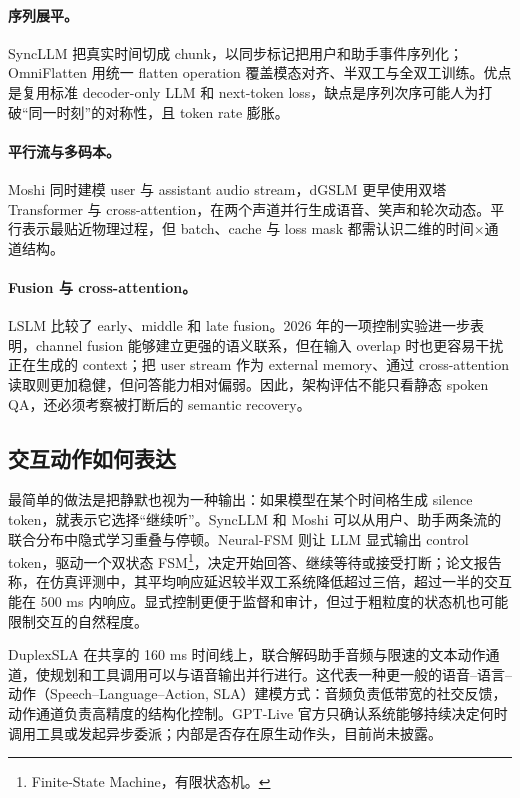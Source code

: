 \paragraph{序列展平。}
SyncLLM 把真实时间切成 chunk，以同步标记把用户和助手事件序列化；OmniFlatten 用统一 flatten operation 覆盖模态对齐、半双工与全双工训练\cite{veluri2024syncllm,zhang2024omniflatten}。优点是复用标准 decoder-only LLM 和 next-token loss，缺点是序列次序可能人为打破“同一时刻”的对称性，且 token rate 膨胀。

\paragraph{平行流与多码本。}
Moshi 同时建模 user 与 assistant audio stream，dGSLM 更早使用双塔 Transformer 与 cross-attention，在两个声道并行生成语音、笑声和轮次动态\cite{nguyen2022dgslm,defossez2024moshi}。平行表示最贴近物理过程，但 batch、cache 与 loss mask 都需认识二维的时间$\times$通道结构。

\paragraph{Fusion 与 cross-attention。}
LSLM 比较了 early、middle 和 late fusion。2026 年的一项控制实验进一步表明，channel fusion 能够建立更强的语义联系，但在输入 overlap 时也更容易干扰正在生成的 context；把 user stream 作为 external memory、通过 cross-attention 读取则更加稳健，但问答能力相对偏弱\cite{ma2025lslm,lu2026routing}。因此，架构评估不能只看静态 spoken QA，还必须考察被打断后的 semantic recovery。

\subsection{交互动作如何表达}

最简单的做法是把静默也视为一种输出：如果模型在某个时间格生成 silence token，就表示它选择“继续听”。SyncLLM 和 Moshi 可以从用户、助手两条流的联合分布中隐式学习重叠与停顿。Neural-FSM 则让 LLM 显式输出 control token，驱动一个双状态 FSM\footnote{Finite-State Machine，有限状态机。}，决定开始回答、继续等待或接受打断；论文报告称，在仿真评测中，其平均响应延迟较半双工系统降低超过三倍，超过一半的交互能在 500 ms 内响应\cite{wang2024neuralfsm}。显式控制更便于监督和审计，但过于粗粒度的状态机也可能限制交互的自然程度。

DuplexSLA 在共享的 160 ms 时间线上，联合解码助手音频与限速的文本动作通道，使规划和工具调用可以与语音输出并行进行\cite{zhang2026duplexsla}。这代表一种更一般的语音--语言--动作（Speech--Language--Action, SLA）建模方式：音频负责低带宽的社交反馈，动作通道负责高精度的结构化控制。GPT-Live 官方只确认系统能够持续决定何时调用工具或发起异步委派；内部是否存在原生动作头，目前尚未披露。

